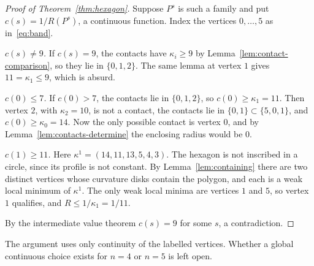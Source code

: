 \begin{proof}[Proof of Theorem~\ref{thm:hexagon}]
Suppose $P^s$ is such a family and put $c(s)=1/R(P^s)$, a continuous function.
Index the vertices $0,\dots,5$ as in~\eqref{eq:band}.

\emph{$c(s)\ne9$.} If $c(s)=9$, the contacts have $\kappa_i\ge9$ by
Lemma~\ref{lem:contact-comparison}, so they lie in $\{0,1,2\}$. The same
lemma at vertex $1$ gives $11=\kappa_1\le9$, which is absurd.

\emph{$c(0)\le7$.} If $c(0)>7$, the contacts lie in $\{0,1,2\}$, so
$c(0)\ge\kappa_1=11$. Then vertex $2$, with $\kappa_2=10$, is not a contact,
the contacts lie in $\{0,1\}\subset\{5,0,1\}$, and $c(0)\ge\kappa_0=14$. Now
the only possible contact is vertex $0$, and by
Lemma~\ref{lem:contacts-determine} the enclosing radius would be $0$.

\emph{$c(1)\ge11$.} Here $\kappa^1=(14,11,13,5,4,3)$. The hexagon is not
inscribed in a circle, since its profile is not constant. By
Lemma~\ref{lem:containing} there are two distinct vertices whose curvature
disks contain the polygon, and each is a weak local minimum of $\kappa^1$.
The only weak local minima are vertices $1$ and $5$, so vertex $1$ qualifies,
and $R\le1/\kappa_1=1/11$.

By the intermediate value theorem $c(s)=9$ for some $s$, a contradiction.
\end{proof}

The argument uses only continuity of the labelled vertices. Whether a global
continuous choice exists for $n=4$ or $n=5$ is left open.
